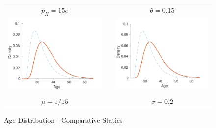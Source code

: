 \documentclass[11pt]{article}
\theoremstyle{definition} %
\begin{document}
\begin{figure}[h!]
\centering
\caption{Age Distribution - Comparative Statics} \label{CS}
\vspace{2mm}
\begin{tabular}{c c c}
$p_H = 15e$ && $\theta = 0.15$ \\
\includegraphics[scale=0.4]{CS1.pdf} && \includegraphics[scale=0.4]{CS2.pdf} \\ \\
$\mu = 1/15$ && $\sigma = 0.2$\\

\end{tabular}
\end{figure}
\end{document}
